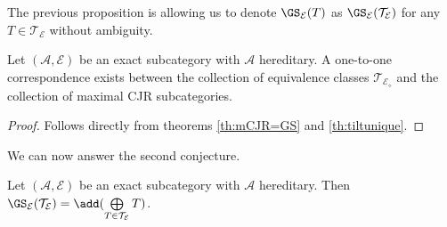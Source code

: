 The previous proposition is allowing us to denote $\GS_\mathcal{E}(T)$ as $\GS_\mathcal{E}(\mathcal{T}_\mathcal{E})$ for any $T \in \mathcal{T}_\mathcal{E}$  without ambiguity.



\begin{theorem}
Let $(\mathscr{A},\mathcal{E})$ be an exact subcategory with $\mathscr{A}$ hereditary. A one-to-one correspondence exists between the collection of equivalence classes $\mathcal{T}_\mathcal{E_\diamond}$ and the collection of maximal CJR subcategories.
\end{theorem}

\begin{proof}
Follows directly from theorems \ref{th:mCJR=GS} and \ref{th:tiltunique}.
\end{proof}



We can now answer the second conjecture.

\begin{theorem}
\label{th:Treaching}
Let $(\mathscr{A},\mathcal{E})$ be an exact subcategory with $\mathscr{A}$ hereditary. Then $\GS_\mathcal{E}(\mathcal{T}_\mathcal{E}) = \add(\bigoplus\limits_{T \in \mathcal{T}_\mathcal{E}} T)$.
\end{theorem}

